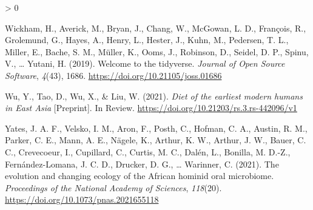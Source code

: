 \documentclass[
]{article}
\newlength{\cslhangindent}
\newenvironment{CSLReferences}[2] %
 {%
  \setlength{\parindent}{0pt}
  \ifodd #1 \everypar{\setlength{\hangindent}{\cslhangindent}}\ignorespaces\fi
  \ifnum #2 > 0
  \setlength{\parskip}{#2\baselineskip}
  \fi
 }%
 {}
\begin{document}
\begin{CSLReferences}{1}{0}
\leavevmode\hypertarget{ref-tidyverse2019}{}%
Wickham, H., Averick, M., Bryan, J., Chang, W., McGowan, L. D., François, R., Grolemund, G., Hayes, A., Henry, L., Hester, J., Kuhn, M., Pedersen, T. L., Miller, E., Bache, S. M., Müller, K., Ooms, J., Robinson, D., Seidel, D. P., Spinu, V., \ldots{} Yutani, H. (2019). Welcome to the {tidyverse}. \emph{Journal of Open Source Software}, \emph{4}(43), 1686. \url{https://doi.org/10.21105/joss.01686}

\leavevmode\hypertarget{ref-wuDietEarliest2021}{}%
Wu, Y., Tao, D., Wu, X., \& Liu, W. (2021). \emph{Diet of the earliest modern humans in {East Asia}} {[}Preprint{]}. {In Review}. \url{https://doi.org/10.21203/rs.3.rs-442096/v1}

\leavevmode\hypertarget{ref-yatesOralMicrobiome2021}{}%
Yates, J. A. F., Velsko, I. M., Aron, F., Posth, C., Hofman, C. A., Austin, R. M., Parker, C. E., Mann, A. E., Nägele, K., Arthur, K. W., Arthur, J. W., Bauer, C. C., Crevecoeur, I., Cupillard, C., Curtis, M. C., Dalén, L., Bonilla, M. D.-Z., Fernández-Lomana, J. C. D., Drucker, D. G., \ldots{} Warinner, C. (2021). The evolution and changing ecology of the {African} hominid oral microbiome. \emph{Proceedings of the National Academy of Sciences}, \emph{118}(20). \url{https://doi.org/10.1073/pnas.2021655118}

\end{CSLReferences}
\end{document}
